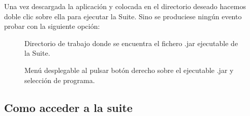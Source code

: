 Una vez descargada la aplicación y colocada en el directorio deseado hacemos doble clic sobre ella para ejecutar la Suite. Sino se produciese ningún evento probar con la siguiente opción:
\begin{figure}[H]
\caption{Directorio de trabajo donde se encuentra el fichero .jar ejecutable de la Suite.}
\end{figure}
\newpage
\begin{figure}[H]
\caption{Menú desplegable al pulsar botón derecho sobre el ejecutable .jar y selección de programa.}
\end{figure}

\subsection{Como acceder a la suite}
\label{cap:Acceder}

